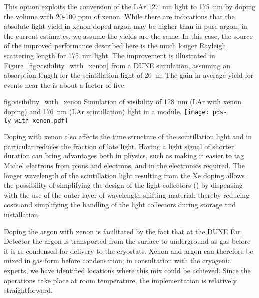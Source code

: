This option exploits the conversion of the LAr \SI{127}{nm} light to \SI{175}{nm} by doping the \lar volume with 20-100 ppm of xenon.  While there are indications that the absolute light yield in xenon-doped argon may be higher than in pure argon, in the current estimates, we assume the yields are the same. In this case, the source of the improved performance described here is the much longer Rayleigh scattering length for \SI{175}{nm} light.  The improvement is illustrated in Figure~\ref{fig:visibility_with_xenon} from a DUNE  simulation, assuming an absorption length for the scintillation light of \SI{20}{m}. The gain in average yield for events near the  is about a factor of five.

\begin{dunefigure}
{fig:visibility_with_xenon}
{Simulation of visibility of \SI{128}{nm} (LAr with xenon doping) and \SI{176}{nm} (LAr scintillation) light in a  module.}
\texttt{[image: pds-ly\_with\_xenon.pdf]}
\end{dunefigure}

Doping with xenon also affects the time structure of the scintillation light and in particular reduces the fraction of late light.  Having a light signal of shorter duration can bring advantages both in physics, such as making it easier to tag Michel electrons from pions and electrons, and in the electronics required. The longer wavelength of the scintillation light resulting from the Xe doping allows the possibility of simplifying the design of the  light collectors () by dispensing with the use of the outer layer of wavelength shifting material, thereby reducing costs and simplifying the handling of the light collectors during storage and installation. 


Doping the argon with xenon is facilitated by the fact that at the DUNE Far Detector the argon is transported from the surface to underground as gas before it is re-condensed for delivery to the cryostats. Xenon and argon can therefore be mixed in gas form before condensation;  in consultation with the cryogenic experts, we have identified locations where this mix could be achieved. Since the operations take place at room temperature, the implementation is relatively straightforward.

